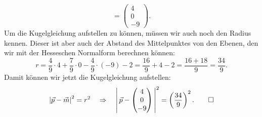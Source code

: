 \begin{loesung}
\[=
\begin{pmatrix}4\\0\\-9\end{pmatrix}.
\]
Um die Kugelgleichung aufstellen zu können, müssen wir auch noch den
Radius kennen.
Dieser ist aber auch der Abstand des Mittelpunktes von den Ebenen,
den wir mit der Hesseschen Normalform berechnen können:
\[
r
=
\frac{4}{9}\cdot 4+\frac{7}{9}\cdot 0-\frac{4}{9}\cdot (-9)-2
=
\frac{16}{9}+4-2
=
\frac{16+18}{9}
=
\frac{34}{9}.
\]
Damit können wir jetzt die Kugelgleichung aufstellen:
\[
\left|\vec p - \vec m \right|^2 = r^2\quad\Rightarrow\quad
\left|\,\vec p - \begin{pmatrix}4\\0\\-9\end{pmatrix}
\,\right|^2=\left(\frac{34}{9}\right)^2.
\qedhere
\]
\end{loesung}
